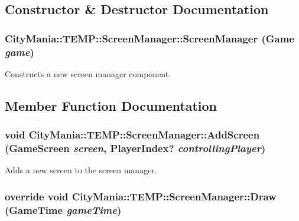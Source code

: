 \subsection{Constructor \& Destructor Documentation}
\hypertarget{classCityMania_1_1TEMP_1_1ScreenManager_ace76a27fd3ec41aaec4de35b39776e8a}{
\subsubsection[{ScreenManager}]{\setlength{\rightskip}{0pt plus 5cm}CityMania::TEMP::ScreenManager::ScreenManager (Game {\em game})}}
\label{classCityMania_1_1TEMP_1_1ScreenManager_ace76a27fd3ec41aaec4de35b39776e8a}


Constructs a new screen manager component. 

\subsection{Member Function Documentation}
\hypertarget{classCityMania_1_1TEMP_1_1ScreenManager_afcb90267a7dd2ba71a8a61da4dd100f4}{
\subsubsection[{AddScreen}]{\setlength{\rightskip}{0pt plus 5cm}void CityMania::TEMP::ScreenManager::AddScreen ({\bf GameScreen} {\em screen}, \/  PlayerIndex? {\em controllingPlayer})}}
\label{classCityMania_1_1TEMP_1_1ScreenManager_afcb90267a7dd2ba71a8a61da4dd100f4}


Adds a new screen to the screen manager. \hypertarget{classCityMania_1_1TEMP_1_1ScreenManager_a032f7787468dfbcc4d130cc53bd9f480}{
\subsubsection[{Draw}]{\setlength{\rightskip}{0pt plus 5cm}override void CityMania::TEMP::ScreenManager::Draw (GameTime {\em gameTime})}}
\label{classCityMania_1_1TEMP_1_1ScreenManager_a032f7787468dfbcc4d130cc53bd9f480}


